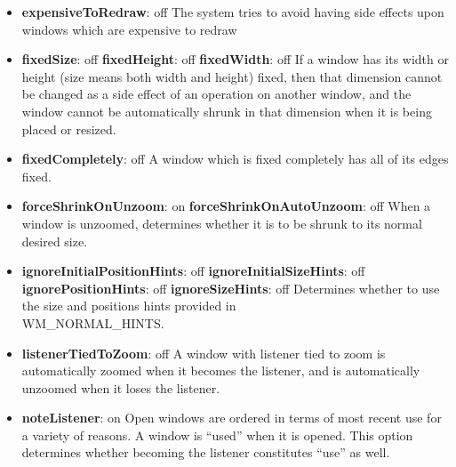 \begin{itemize}
\item {\bf expensiveToRedraw}: off\newline{}
The system tries to avoid having side effects upon windows
which are expensive to redraw

\item {\bf fixedSize}: off\newline{}
{\bf fixedHeight}: off\newline{}
{\bf fixedWidth}: off\newline{}
If a window has its width or height (size means both width and
height) fixed, then that dimension cannot be changed as a side
effect of an operation on another window, and the window cannot
be automatically shrunk in that dimension when it is being placed
or resized.

\item {\bf fixedCompletely}: off\newline{}
A window which is fixed completely has all of its edges fixed.

\item {\bf forceShrinkOnUnzoom}: on\newline{}
{\bf forceShrinkOnAutoUnzoom}: off\newline{}
When a window is unzoomed, determines whether it is to be shrunk
to its normal desired size.

\item {\bf ignoreInitialPositionHints}: off\newline{}
{\bf ignoreInitialSizeHints}: off\newline{}
{\bf ignorePositionHints}: off\newline{}
{\bf ignoreSizeHints}: off\newline{}
Determines whether to use the size and positions hints provided
in \\ {\sc WM\_NORMAL\_HINTS}.

\item {\bf listenerTiedToZoom}: off\newline{}
A window with listener tied to zoom is automatically zoomed when it
becomes the listener, and is automatically unzoomed when it loses
the listener.

\item {\bf noteListener}: on\newline{}
Open windows are ordered in terms of most recent use for a
variety of reasons.  A window is ``used'' when it is opened.
This option determines whether becoming the listener constitutes ``use'' as
well.


\end{itemize}
